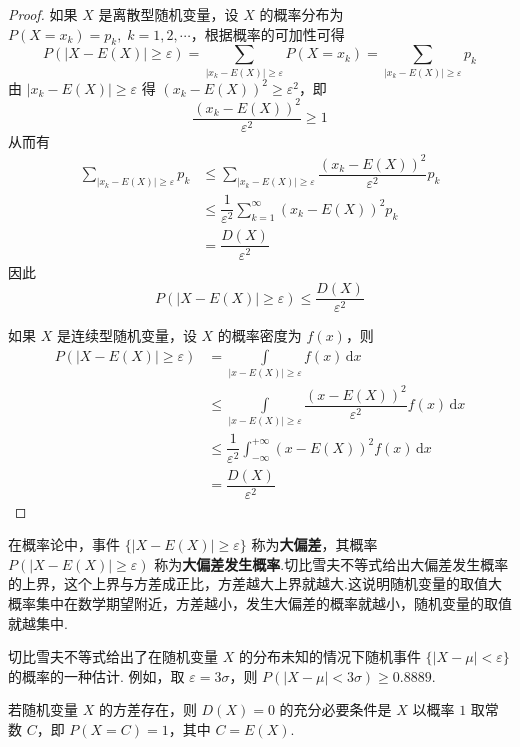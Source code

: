 \begin{proof}
    如果 $X$ 是离散型随机变量，设 $X$ 的概率分布为 $P(X = x_k) = p_k, \; k=1,2,\cdots$，根据概率的可加性可得
    $$
    P(|X-E(X)| \geqslant \varepsilon) = \sum_{|x_k-E(X)| \geqslant \varepsilon} P(X=x_k) = \sum_{|x_k-E(X)| \geqslant \varepsilon} p_k
    $$
    由 $|x_k-E(X)| \geqslant \varepsilon$ 得 $(x_k-E(X))^2 \geqslant \varepsilon^2$，即
    $$
    \dfrac{(x_k-E(X))^2}{\varepsilon^2} \geqslant 1
    $$
    从而有
    $$
    \begin{aligned}
        \sum_{|x_k-E(X)| \geqslant \varepsilon} p_k & \leqslant \sum_{|x_k-E(X)| \geqslant \varepsilon} \dfrac{(x_k-E(X))^2}{\varepsilon^2} p_k \\
        & \leqslant \dfrac{1}{\varepsilon^2} \sum_{k=1}^{\infty} (x_k-E(X))^2 p_k \\
        &= \dfrac{D(X)}{\varepsilon^2}
    \end{aligned}
    $$
    因此
    $$
    P(|X-E(X)| \geqslant \varepsilon) \leqslant \dfrac{D(X)}{\varepsilon^2}
    $$

    如果 $X$ 是连续型随机变量，设 $X$ 的概率密度为 $f(x)$，则
    $$
    \begin{aligned}
        P(|X-E(X)| \geqslant \varepsilon) &= \underset{|x-E(X)| \geqslant \varepsilon}{\int} f(x) \, \text{d}x \\
         & \leqslant \underset{|x-E(X)| \geqslant \varepsilon}{\int} \dfrac{(x-E(X))^2}{\varepsilon^2} f(x) \, \text{d}x \\
         & \leqslant \dfrac{1}{\varepsilon^2} \int_{-\infty}^{+\infty} (x-E(X))^2 f(x) \, \text{d}x \\
         &= \dfrac{D(X)}{\varepsilon^2}
    \end{aligned}
    $$
\end{proof}

在概率论中，事件 $\{ |X-E(X)| \geqslant \varepsilon \}$ 称为\textbf{大偏差}，其概率 $P(|X-E(X)| \geqslant \varepsilon)$ 称为\textbf{大偏差发生概率}.切比雪夫不等式给出大偏差发生概率的上界，这个上界与方差成正比，方差越大上界就越大.这说明随机变量的取值大概率集中在数学期望附近，方差越小，发生大偏差的概率就越小，随机变量的取值就越集中.

切比雪夫不等式给出了在随机变量 $X$ 的分布未知的情况下随机事件 $\{ |X-\mu| < \varepsilon \}$ 的概率的一种估计. 例如，取 $\varepsilon = 3\sigma$，则 $P(|X-\mu| < 3\sigma) \geqslant 0.8889$.

\begin{theorem}[][][prop:D(X)=0]
    \indent 若随机变量 $X$ 的方差存在，则 $D(X)=0$ 的充分必要条件是 $X$ 以概率 $1$ 取常数 $C$，即 $P(X=C)=1$，其中 $C=E(X)$.
\end{theorem}

